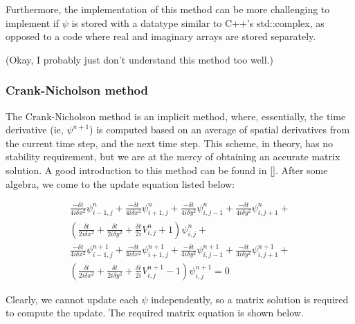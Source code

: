 \documentclass[letterpaper,12pt]{article}
\begin{document}
Furthermore, the implementation of this method can be more challenging to implement if $\psi$ is stored with a datatype similar to C++'s std::complex, as opposed to a code where real and imaginary arrays are stored separately.

(Okay, I probably just don't understand this method too well.)


\subsubsection{Crank-Nicholson method}

The Crank-Nicholson method is an implicit method, where, essentially, the time derivative (ie, $\psi^{n+1}$) is computed based on an average of spatial derivatives from the current time step, and the next time step. This scheme, in theory, has no stability requirement, but we are at the mercy of obtaining an accurate matrix solution. A good introduction to this method can be found in [].  After some algebra, we come to the update equation listed below:
  
\begin{equation}
\begin{split}
\frac{-\delta t}{4i\delta x^2}\psi^n_{i-1,j} + 
\frac{-\delta t}{4i\delta x^2}\psi^n_{i+1,j} +
\frac{-\delta t}{4i\delta y^2}\psi^n_{i,j-1} + 
 \frac{-\delta t}{4i\delta y^2}\psi^n_{i,j+1} + \\ 
(  \frac{\delta t}{2i\delta x^2} + \frac{\delta t}{2i\delta y^2} + \frac{\delta t} {2i}V^n_{i,j} + 1)\psi^n_{i,j} + \\
 \frac{-\delta t}{4i\delta x^2}\psi^{n+1}_{i-1,j} + 
 \frac{-\delta t}{4i\delta x^2}\psi^{n+1}_{i+1,j} + 
\frac{-\delta t}{4i\delta y^2}\psi^{n+1}_{i,j-1} + 
 \frac{-\delta t}{4i\delta y^2}\psi^{n+1}_{i,j+1} + \\ 
(  \frac{\delta t}{2i\delta x^2} + \frac{\delta t}{2i\delta y^2} + \frac{\delta t} {2i}V^{n+1}_{i,j} -1)\psi^{n+1}_{i,j} = 0 
\end{split}
\end{equation}

Clearly, we cannot update each $\psi$ independently, so a matrix solution is required to compute the update. The required matrix equation is shown below.
\end{document}

